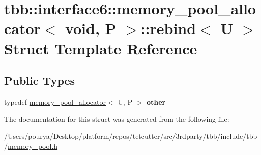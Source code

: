 \hypertarget{structtbb_1_1interface6_1_1memory__pool__allocator_3_01void_00_01P_01_4_1_1rebind}{}\section{tbb\+:\+:interface6\+:\+:memory\+\_\+pool\+\_\+allocator$<$ void, P $>$\+:\+:rebind$<$ U $>$ Struct Template Reference}
\label{structtbb_1_1interface6_1_1memory__pool__allocator_3_01void_00_01P_01_4_1_1rebind}
\subsection*{Public Types}
\begin{DoxyCompactItemize}
\item 
\hypertarget{structtbb_1_1interface6_1_1memory__pool__allocator_3_01void_00_01P_01_4_1_1rebind_a4a2190850873b9f2bc63c28dfd336dd9}{}typedef \hyperlink{classtbb_1_1interface6_1_1memory__pool__allocator}{memory\+\_\+pool\+\_\+allocator}$<$ U, P $>$ {\bfseries other}\label{structtbb_1_1interface6_1_1memory__pool__allocator_3_01void_00_01P_01_4_1_1rebind_a4a2190850873b9f2bc63c28dfd336dd9}

\end{DoxyCompactItemize}


The documentation for this struct was generated from the following file\+:\begin{DoxyCompactItemize}
\item 
/\+Users/pourya/\+Desktop/platform/repos/tetcutter/src/3rdparty/tbb/include/tbb/\hyperlink{memory__pool_8h}{memory\+\_\+pool.\+h}\end{DoxyCompactItemize}
